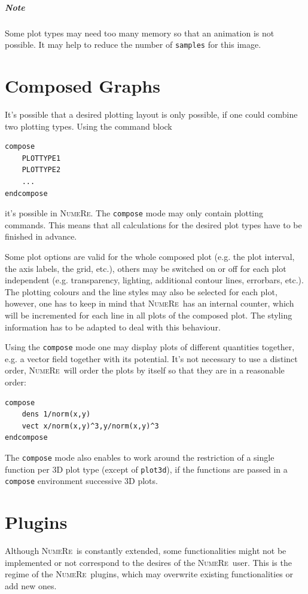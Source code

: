 \documentclass[DIV=14,headsepline,footsepline]{scrbook}
\newcommand{\NR}{\textsc{Nu\-me\-Re}}
\begin{document}
			\paragraph{Note}
				Some plot types may need too many memory so that an animation is not possible. It may help to reduce the number of \lstinline+samples+ for this image.
		\chapter{Composed Graphs}
			It's possible that a desired plotting layout is only possible, if one could combine two plotting types. Using the command block
			\begin{lstlisting}
compose
	PLOTTYPE1
	PLOTTYPE2
	...
endcompose
			\end{lstlisting}
			it's possible in \NR. The \lstinline+compose+ mode may only contain plotting commands. This means that all calculations for the desired plot types have to be finished in advance.
			
			Some plot options are valid for the whole composed plot (e.g. the plot interval, the axis labels, the grid, etc.), others may be switched on or off for each plot independent (e.g. transparency, lighting, additional contour lines, errorbars, etc.). The plotting colours and the line styles may also be selected for each plot, however, one has to keep in mind that \NR\ has an internal counter, which will be incremented for each line in all plots of the composed plot. The styling information has to be adapted to deal with this behaviour.
			
			Using the \lstinline+compose+ mode one may display plots of different quantities together, e.g. a vector field together with its potential. It's not necessary to use a distinct order, \NR\ will order the plots by itself so that they are in a reasonable order:
			\begin{lstlisting}
compose
	dens 1/norm(x,y)
	vect x/norm(x,y)^3,y/norm(x,y)^3
endcompose
			\end{lstlisting}
			
			The \lstinline+compose+ mode also enables to work around the restriction of a single function per 3D plot type (except of \lstinline+plot3d+), if the functions are passed in a \lstinline+compose+ environment successive 3D plots.
		\chapter{Plugins}
			Although \NR\ is constantly extended, some functionalities might not be implemented or not correspond to the desires of the \NR\ user. This is the regime of the \NR\ plugins, which may overwrite existing functionalities or add new ones.
\end{document}
